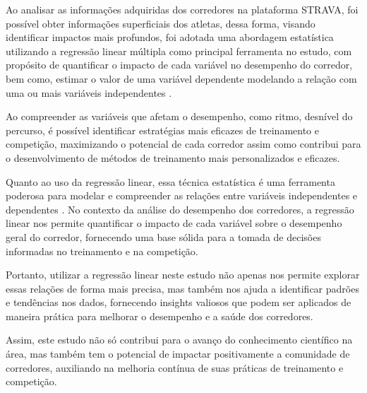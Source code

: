 Ao analisar as informações adquiridas dos corredores na plataforma STRAVA, foi possível obter informações superficiais dos atletas, dessa forma, visando identificar impactos mais profundos, foi adotada uma abordagem estatística utilizando a regressão linear múltipla como principal ferramenta no estudo, com propósito de quantificar o impacto de cada variável no desempenho do corredor, bem como, estimar o valor de uma variável dependente modelando a relação com uma ou mais variáveis independentes \citet{hoffmann}. 

Ao compreender as variáveis que afetam o desempenho, como ritmo, desnível do percurso, é possível identificar estratégias mais eficazes de treinamento e competição, maximizando o potencial de cada corredor assim como contribui para o desenvolvimento de métodos de treinamento mais personalizados e eficazes. 

Quanto ao uso da regressão linear, essa técnica estatística é uma ferramenta poderosa para modelar e compreender as relações entre variáveis independentes e dependentes \citet{hoffmann}.  No contexto da análise do desempenho dos corredores, a regressão linear nos permite quantificar o impacto de cada variável sobre o desempenho geral do corredor, fornecendo uma base sólida para a tomada de decisões informadas no treinamento e na competição. 

Portanto, utilizar a regressão linear neste estudo não apenas nos permite explorar essas relações de forma mais precisa, mas também nos ajuda a identificar padrões e tendências nos dados, fornecendo insights valiosos que podem ser aplicados de maneira prática para melhorar o desempenho e a saúde dos corredores. 

Assim, este estudo não só contribui para o avanço do conhecimento científico na área, mas também tem o potencial de impactar positivamente a comunidade de corredores, auxiliando na melhoria contínua de suas práticas de treinamento e competição.
















